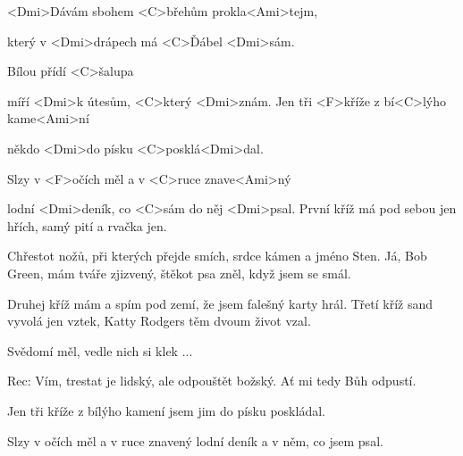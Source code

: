 
\zs
<Dmi>Dávám sbohem <C>břehům prokla<Ami>tejm,

který v <Dmi>drápech má <C>Ďábel <Dmi>sám.

Bílou přídí <C>šalupa 

míří <Dmi>k útesům, <C>který <Dmi>znám.
\ks
\zr
Jen tři <F>kříže z bí<C>lýho kame<Ami>ní

někdo <Dmi>do písku <C>posklá<Dmi>dal.

Slzy v <F>očích měl a v <C>ruce znave<Ami>ný

lodní <Dmi>deník, co <C>sám do něj <Dmi>psal.
\kr
\zs
První kříž má pod sebou jen hřích, samý pití a rvačka jen.

Chřestot nožů, při kterých přejde smích, srdce kámen a jméno Sten.
\ks
\zr \kr
\zs
Já, Bob Green, mám tváře zjizvený, štěkot psa zněl, když jsem se smál.

Druhej kříž mám a spím pod zemí, že jsem falešný karty hrál.
\ks
\zr \kr
\zs
Třetí kříž sand vyvolá jen vztek, Katty Rodgers těm dvoum život vzal.

Svědomí měl, vedle nich si klek ...
\ks

Rec: Vím, trestat je lidský, ale odpouštět božský. Ať mi tedy Bůh odpustí.

\zr
Jen tři kříže z bílýho kamení jsem jim do písku poskládal.

Slzy v očích měl a v ruce znavený lodní deník a v něm, co jsem psal.
\kr
\kp
























